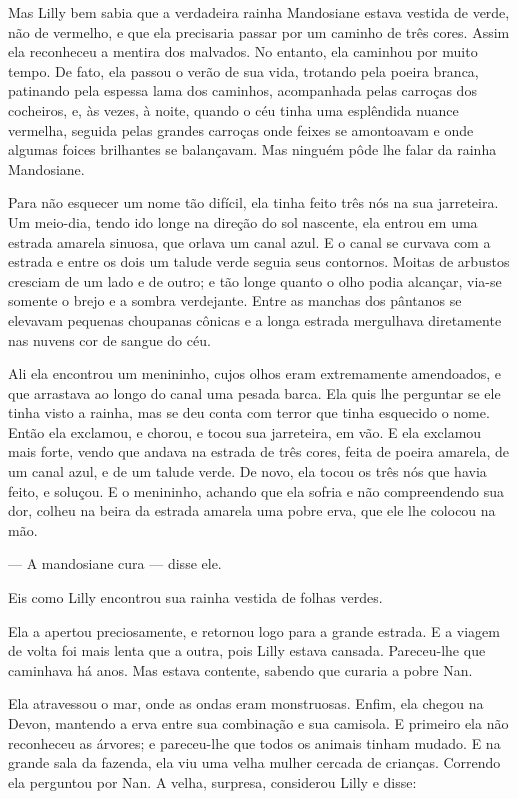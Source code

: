 Mas Lilly bem sabia que a verdadeira rainha Mandosiane estava vestida
de verde, não de vermelho, e que ela precisaria passar por um caminho de
três cores. Assim ela reconheceu a mentira dos malvados. No entanto, ela
caminhou por muito tempo. De fato, ela passou o verão de sua vida,
trotando pela poeira branca, patinando pela espessa lama dos caminhos,
acompanhada pelas carroças dos cocheiros, e, às vezes, à noite, quando o
céu tinha uma esplêndida nuance vermelha, seguida pelas grandes carroças
onde feixes se amontoavam e onde algumas foices brilhantes se balançavam.
Mas ninguém pôde lhe falar da rainha Mandosiane.

Para não esquecer um nome tão difícil, ela tinha feito três nós na sua
jarreteira. Um meio-dia, tendo ido longe na direção do sol nascente, ela
entrou em uma estrada amarela sinuosa, que orlava um canal azul. E o canal
se curvava com a estrada e entre os dois um talude verde seguia seus
contornos. Moitas de arbustos cresciam de um lado e de outro; e tão longe
quanto o olho podia alcançar, via-se somente o brejo e a sombra
verdejante. Entre as manchas dos pântanos se elevavam pequenas choupanas
cônicas e a longa estrada mergulhava diretamente nas nuvens cor de sangue
do céu.

Ali ela encontrou um menininho, cujos olhos eram extremamente
amendoados, e que arrastava ao longo do canal uma pesada barca. Ela quis
lhe perguntar se ele tinha visto a rainha, mas se deu conta com terror que
tinha esquecido o nome. Então ela exclamou, e chorou, e tocou sua
jarreteira, em vão. E ela exclamou mais forte, vendo que andava na estrada
de três cores, feita de poeira amarela, de um canal azul, e de um talude
verde. De novo, ela tocou os três nós que havia feito, e soluçou. E o
menininho, achando que ela sofria e não compreendendo sua dor, colheu na
beira da estrada amarela uma pobre erva, que ele lhe colocou na mão.

--- A mandosiane cura --- disse ele.

Eis como Lilly encontrou sua rainha vestida de folhas verdes.

Ela a apertou preciosamente, e retornou logo para a grande estrada. E a
viagem de volta foi mais lenta que a outra, pois Lilly estava cansada.
Pareceu-lhe que caminhava há anos. Mas estava contente, sabendo que
curaria a pobre Nan.

Ela atravessou o mar, onde as ondas eram monstruosas. Enfim, ela chegou
na Devon, mantendo a erva entre sua combinação e sua camisola. E primeiro
ela não reconheceu as árvores; e pareceu-lhe que todos os animais tinham
mudado. E na grande sala da fazenda, ela viu uma velha mulher cercada de
crianças. Correndo ela perguntou por Nan. A velha, surpresa, considerou
Lilly e disse:

